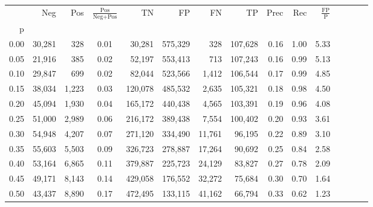 \begin{tabular}{rrrcrrrrrrrrrrr}
\toprule
{} &     Neg &    Pos & $\frac{\text{Pos}}{\text{Neg}+\text{Pos}}$ &       TN &       FP &       FN &       TP &  Prec &   Rec & $\frac{\text{FP}}{\text{P}}$ \\
p    &         &        &                                            &          &          &          &          &       &       &                              \\
\midrule
0.00 &  30,281 &    328 &                                       0.01 &   30,281 &  575,329 &      328 &  107,628 &  0.16 &  1.00 &                         5.33 \\
0.05 &  21,916 &    385 &                                       0.02 &   52,197 &  553,413 &      713 &  107,243 &  0.16 &  0.99 &                         5.13 \\
0.10 &  29,847 &    699 &                                       0.02 &   82,044 &  523,566 &    1,412 &  106,544 &  0.17 &  0.99 &                         4.85 \\
0.15 &  38,034 &  1,223 &                                       0.03 &  120,078 &  485,532 &    2,635 &  105,321 &  0.18 &  0.98 &                         4.50 \\
0.20 &  45,094 &  1,930 &                                       0.04 &  165,172 &  440,438 &    4,565 &  103,391 &  0.19 &  0.96 &                         4.08 \\
0.25 &  51,000 &  2,989 &                                       0.06 &  216,172 &  389,438 &    7,554 &  100,402 &  0.20 &  0.93 &                         3.61 \\
0.30 &  54,948 &  4,207 &                                       0.07 &  271,120 &  334,490 &   11,761 &   96,195 &  0.22 &  0.89 &                         3.10 \\
0.35 &  55,603 &  5,503 &                                       0.09 &  326,723 &  278,887 &   17,264 &   90,692 &  0.25 &  0.84 &                         2.58 \\
0.40 &  53,164 &  6,865 &                                       0.11 &  379,887 &  225,723 &   24,129 &   83,827 &  0.27 &  0.78 &                         2.09 \\
0.45 &  49,171 &  8,143 &                                       0.14 &  429,058 &  176,552 &   32,272 &   75,684 &  0.30 &  0.70 &                         1.64 \\
0.50 &  43,437 &  8,890 &                                       0.17 &  472,495 &  133,115 &   41,162 &   66,794 &  0.33 &  0.62 &                         1.23 \\

\end{tabular}
